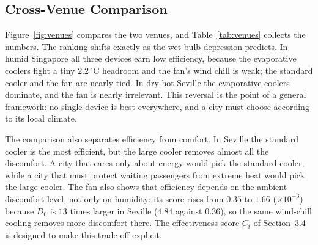 \documentclass[11pt]{article}
\begin{document}
\subsection{Cross-Venue Comparison}

Figure~\ref{fig:venues} compares the two venues, and Table~\ref{tab:venues}
collects the numbers. The ranking shifts exactly as the wet-bulb depression
predicts. In humid Singapore all three devices earn low efficiency, because the
evaporative coolers fight a tiny $2.2\,^\circ$C headroom and the fan's wind
chill is weak; the standard cooler and the fan are nearly tied. In dry-hot
Seville the evaporative coolers dominate, and the fan is nearly irrelevant.
This reversal is the point of a general framework: no single device is best
everywhere, and a city must choose according to its local climate.

The comparison also separates efficiency from comfort. In Seville the standard
cooler is the most efficient, but the large cooler removes almost all the
discomfort. A city that cares only about energy would pick the standard cooler,
while a city that must protect waiting passengers from extreme heat would pick
the large cooler. The fan also shows that efficiency depends on the ambient
discomfort level, not only on humidity: its score rises from $0.35$ to $1.66$
($\times10^{-3}$) because $D_0$ is $13$ times larger in Seville ($4.84$ against
$0.36$), so the same wind-chill cooling removes more discomfort there. The
effectiveness score $C_i$ of Section~3.4 is designed to make this trade-off
explicit.
\end{document}
